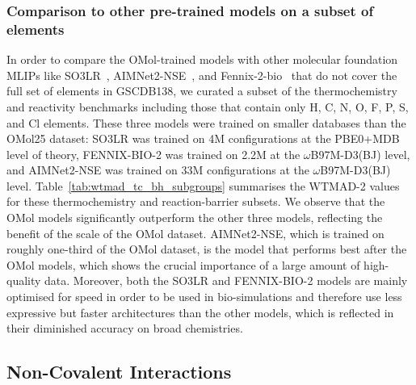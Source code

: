 \documentclass[aps,%
superscriptaddress,
 amsmath,amssymb,
floatfix,
twocolumn
]{revtex4-2}
\begin{document}
\subsubsection{Comparison to other pre-trained models on a subset of elements} In order to compare the OMol-trained models with other molecular foundation MLIPs like SO3LR~\cite{kabylda2025so3lr}, AIMNet2-NSE~\cite{Kalita2025}, and Fennix-2-bio~\cite{PL_2025} that do not cover the full set of elements in GSCDB138, we curated a subset of the thermochemistry and reactivity benchmarks including those that contain only H, C, N, O, F, P, S, and Cl
elements. These three models were trained on smaller databases than the OMol25 dataset: SO3LR was trained on 4M configurations at the PBE0+MDB level of theory, FENNIX-BIO-2 was trained on 2.2M at the $\omega$B97M-D3(BJ) level, and AIMNet2-NSE was trained on 33M configurations at the $\omega$B97M-D3(BJ) level.
Table~\ref{tab:wtmad_tc_bh_subgroups} summarises the WTMAD-2 values for these thermochemistry and reaction-barrier subsets. We observe that the OMol models significantly outperform the other three models, reflecting the benefit of the scale of the OMol dataset. AIMNet2-NSE, which is trained on roughly one-third of the OMol dataset, is the model that performs best after the OMol models, which shows the crucial importance of a large amount of high-quality data. Moreover, both the SO3LR and FENNIX-BIO-2 models are mainly optimised for speed in order to be used in bio-simulations and therefore use less expressive but faster architectures than the other models, which is reflected in their diminished accuracy on broad chemistries.

\subsection{Non-Covalent Interactions}
\end{document}
